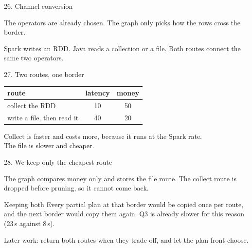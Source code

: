 \documentclass[aspectratio=169,11pt]{beamer}
\begin{document}
\begin{frame}{26. Channel conversion}

{\small The operators are already chosen. The graph only picks how the rows cross the border.}

\vspace{0.45cm}
\centering
{}

\vspace{0.4cm}
{\small Spark writes an RDD. Java reads a collection or a file. Both routes connect the same two operators.}
\end{frame}

\begin{frame}{27. Two routes, one border}

\centering
\renewcommand{\arraystretch}{1.25}
\setlength{\tabcolsep}{10pt}
{\small
\begin{tabular}{@{}lcc@{}}
\toprule
route & latency & money \\
\midrule
collect the RDD & 10 & 50 \\
write a file, then read it & 40 & 20 \\
\bottomrule
\end{tabular}}

\vspace{0.55cm}
{\small Collect is faster and costs more, because it runs at the Spark rate.\\
The file is slower and cheaper.}
\end{frame}

\begin{frame}{28. We keep only the cheapest route}

{\small The graph compares money only and stores the file route. The collect route is dropped before pruning, so it cannot come back.}

\vspace{0.4cm}
\begin{block}{Keeping both}
Every partial plan at that border would be copied once per route, and the next border would copy them again. Q3 is already slower for this reason (23\,s against 8\,s).
\end{block}

\vspace{0.35cm}
{\small Later work: return both routes when they trade off, and let the plan front choose.}
\end{frame}
\end{document}
